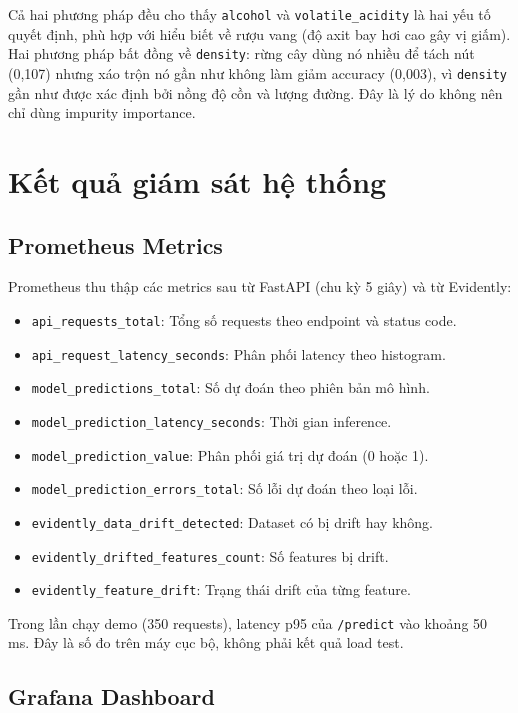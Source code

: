\documentclass[12pt,a4paper]{report}
\begin{document}
Cả hai phương pháp đều cho thấy \texttt{alcohol} và \texttt{volatile\_acidity} là hai yếu tố quyết định, phù hợp với hiểu biết về rượu vang (độ axit bay hơi cao gây vị giấm). Hai phương pháp bất đồng về \texttt{density}: rừng cây dùng nó nhiều để tách nút (0,107) nhưng xáo trộn nó gần như không làm giảm accuracy (0,003), vì \texttt{density} gần như được xác định bởi nồng độ cồn và lượng đường. Đây là lý do không nên chỉ dùng impurity importance.

\section{Kết quả giám sát hệ thống}

\subsection{Prometheus Metrics}

Prometheus thu thập các metrics sau từ FastAPI (chu kỳ 5 giây) và từ Evidently:
\begin{itemize}
  \item \texttt{api\_requests\_total}: Tổng số requests theo endpoint và status code.
  \item \texttt{api\_request\_latency\_seconds}: Phân phối latency theo histogram.
  \item \texttt{model\_predictions\_total}: Số dự đoán theo phiên bản mô hình.
  \item \texttt{model\_prediction\_latency\_seconds}: Thời gian inference.
  \item \texttt{model\_prediction\_value}: Phân phối giá trị dự đoán (0 hoặc 1).
  \item \texttt{model\_prediction\_errors\_total}: Số lỗi dự đoán theo loại lỗi.
  \item \texttt{evidently\_data\_drift\_detected}: Dataset có bị drift hay không.
  \item \texttt{evidently\_drifted\_features\_count}: Số features bị drift.
  \item \texttt{evidently\_feature\_drift}: Trạng thái drift của từng feature.
\end{itemize}

Trong lần chạy demo (350 requests), latency p95 của \texttt{/predict} vào khoảng 50 ms. Đây là số đo trên máy cục bộ, không phải kết quả load test.

\subsection{Grafana Dashboard}
\end{document}
